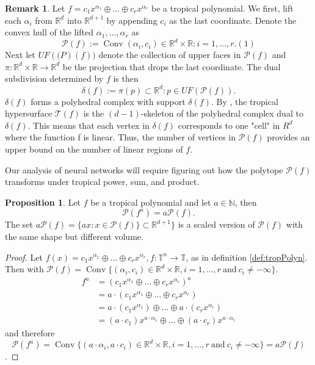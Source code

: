 \documentclass{article}
\theoremstyle{definition}
\newtheorem{proposition}[theorem]{Proposition}
\newtheorem{remark}[theorem]{Remark}
\DeclareMathOperator{\Conv}{Conv}
\begin{document}
\begin{remark}\cite[p.~3]{zhang2018tropical}
Let $f = c_1 x^{\alpha_1} \oplus \dots \oplus c_r x^{\alpha_r}$ be a tropical polynomial. We first, lift each $\alpha_i$ from $\mathbb{R}^d$ into $\mathbb{R}^{d+1}$ by appending $c_i$ as the last coordinate. Denote the convex hull of the lifted $\alpha_1, \dots , \alpha_r$ as
$$\mathcal{P}(f):= \Conv{(\alpha_i, c_i) \in \mathbb{R}^{d} \times \mathbb{R} : i = 1, \dots , r}. (1)$$
Next let $UF(\mathcal(P)(f))$ denote the collection of upper faces in $\mathcal{P}(f)$ and $\pi : \mathbb{R}^{d} \times \mathbb{R} \to \mathbb{R}^{d}$ be the projection that drops
the last coordinate. The dual subdivision determined by $f$
is then
$$\delta(f) := {\pi(p) \subset \mathbb{R}^{d} : p \in UF( \mathcal{P}(f))}.$$
$\delta (f)$ forms a polyhedral complex with support $\delta (f)$. By \cite[Proposition 3.1.6.]{maclagan2015introduction}, the tropical hypersurface $\mathcal{T}(f)$ is the $(d - 1)$-skeleton of the polyhedral complex dual to $ \delta(f)$. This means that each vertex in $ \delta(f)$ corresponds to one "cell" in $R^{d}$ where the function f is linear. Thus, the number of vertices in $\mathcal{P}(f)$ provides an upper bound on the number of linear regions of $f$.
\end{remark}

Our analysis of neural networks will require figuring out
how the polytope $\mathcal{P}(f)$ transforms under tropical power,
sum, and product.

\begin{proposition}\cite[p.~4]{zhang2018tropical}
Let $f$ be a tropical polynomial and let $a \in \mathbb{N}$, then
$$ \mathcal{P}(f^{a}) = a \mathcal{P}(f).$$
The set $a \mathcal{P}(f) = \{ax : x \in \mathcal{P}(f) \} \subset \mathbb{R}^{d + 1}\}$ is a scaled version of $\mathcal{P}(f)$ with the same shape but different volume.
\end{proposition}
\begin{proof}
Let $f(x)=c_{1}x^{\alpha_1} \oplus \dots \oplus c_{r}x^{\alpha_r}, f:\mathbb{T}^{n} \to \mathbb{T}$, as in definition \ref{def:tropPolyn}. Then with $\mathcal{P}(f) = \Conv\{(\alpha_{i}, c_{i}) \in \mathbb{R}^{d} \times \mathbb{R}, i= 1, \dots , r \ \text{and} \ c_{i} \neq - \infty \}$.
\begin{align*}
f^{a} &= (c_{1}x^{\alpha_{1}} \oplus \dots \oplus c_{r} x^{\alpha_{r}})^{a} \\
&= a \cdot (c_{1}x^{\alpha_{1}} \oplus \dots \oplus c_{r} x^{\alpha_{r}}) \\
&= a \cdot (c_{1}x^{\alpha_{1}}) \oplus \dots \oplus a \cdot (c_{r} x^{\alpha_{r}}) \\
&= (a \cdot c_{1})x^{a \cdot \alpha_{1}} \oplus \dots \oplus (a \cdot c_{r}) x^{a \cdot \alpha_{r}}
\end{align*}
and therefore
$$\mathcal{P}(f^{a}) = \Conv\{(a \cdot \alpha_{i}, a \cdot c_{i}) \in \mathbb{R}^{d} \times \mathbb{R}, i = 1, \dots, r \ \text{and} \ c_{i} \neq - \infty \} = a\mathcal{P}(f)$$.
\end{proof}
\end{document}
